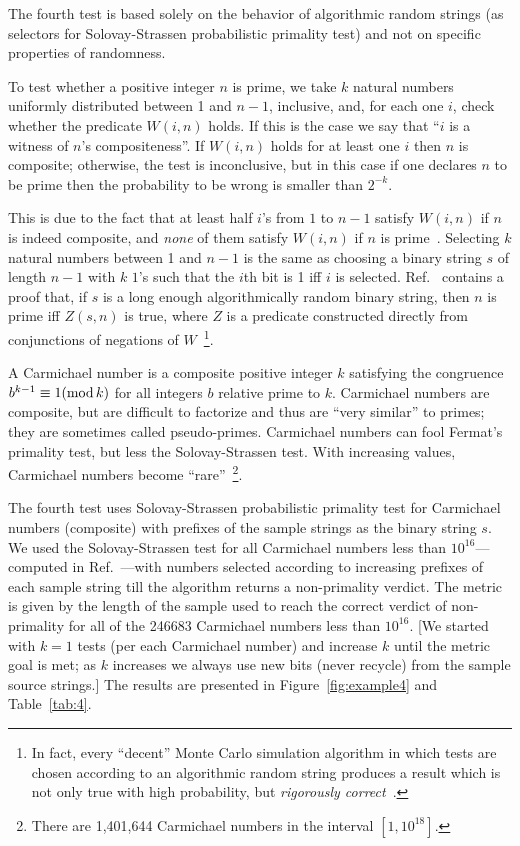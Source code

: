 \documentclass[10pt]{article}%
\begin{document}
The fourth test is   based solely on the behavior of algorithmic random strings (as
selectors for Solovay-Strassen probabilistic primality test) and not on specific properties of randomness.

To test whether  a positive integer
$n$ is prime, we take $k$ natural numbers uniformly distributed between 1
and $n - 1$, inclusive, and, for each one $i$, check whether the predicate
$W (i, n)$ holds.  If this is the case we say that
``$i$ is a witness of $n$'s compositeness''.
If $W (i, n)$ holds for at least one $i$ then $n$ is
composite; otherwise, the test is inconclusive, but in this case if one declares $n$ to be  prime then the
 probability to be wrong is smaller than $ 2^{-k}$.

 This is due to the fact that
 at least half  $i$'s from $1$ to $ n - 1$ satisfy $W (i, n)$  if $n$ is indeed composite,
 and {\it none} of them satisfy $W (i, n)$ if $n$ is prime~\cite{solovay:84}.
Selecting $k$ natural numbers  between 1
and $n - 1$ is the same as choosing a binary string $s$ of length $n-1$ with $k$ $1$'s
such that the $i$th bit is 1 iff $i$ is selected.
Ref.~\cite{ch-schw-78} contains a  proof that, if $s$ is a long enough   algorithmically random binary string,
then $n$ is prime iff $Z(s,n)$ is true,
where $Z$ is a predicate constructed directly from conjunctions of negations of  $W$~\footnote{
In fact, every  ``decent'' Monte Carlo simulation algorithm in  which  tests are chosen according to an
algorithmic random string produces a result
which is not only true with high probability, but {\it rigorously correct}~\cite{MR757602}.}.

A Carmichael number is a composite positive integer $k$ satisfying the congruence $b^{k-1} \equiv 1 ({\rm mod } \, k)$
for all integers $b$ relative prime to $k$.
Carmichael numbers are composite, but are difficult to factorize and thus are ``very similar'' to primes;
they are sometimes called pseudo-primes.
Carmichael numbers can fool Fermat's primality test, but less   the Solovay-Strassen test.
With increasing values, Carmichael numbers
become ``rare''~\footnote{There are 1,401,644 Carmichael numbers in the interval $[1, 10^{18}]$.}.



The fourth test uses Solovay-Strassen probabilistic primality test for
Carmichael numbers (composite) with prefixes of the sample strings as the binary
string $s$. We used the Solovay-Strassen  test for all Carmichael numbers less
than $10^{16}$---computed in Ref.~\cite{Pinch,Pinch07}---with numbers selected according to increasing prefixes of each sample string till the algorithm returns
a non-primality verdict. The metric is given by the length of the sample used to
reach the correct
verdict of non-primality for all of the 246683 Carmichael numbers less than
$10^{16}$.  [We started with $k=1$ tests (per each Carmichael number) and increase $k$
until the metric goal is met; as $k$ increases we always use new bits (never
recycle) from the sample source strings.]
The results are presented in
Figure~\ref{fig:example4} and Table~\ref{tab:4}.
\end{document}
